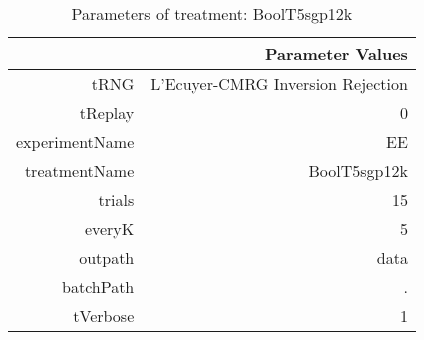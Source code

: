 \begin{table}[ht]
\centering
\begin{tabular}{rr}
  \hline
 & Parameter Values \\ 
  \hline
tRNG & L'Ecuyer-CMRG Inversion Rejection \\ 
  tReplay & 0 \\ 
  experimentName & EE \\ 
  treatmentName & BoolT5sgp12k \\ 
  trials & 15 \\ 
  everyK & 5 \\ 
  outpath & data \\ 
  batchPath & . \\ 
  tVerbose & 1 \\ 
   \hline
\end{tabular}
\caption{ Parameters of treatment: BoolT5sgp12k 
} 
\end{table}
